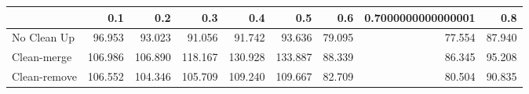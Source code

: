 \begin{tabular}{lrrrrrrrr}
\toprule
{} &     0.1 &     0.2 &     0.3 &     0.4 &     0.5 &    0.6 & 0.7000000000000001 &    0.8 \\
\midrule
No Clean Up  &  96.953 &  93.023 &  91.056 &  91.742 &  93.636 & 79.095 &             77.554 & 87.940 \\
Clean-merge  & 106.986 & 106.890 & 118.167 & 130.928 & 133.887 & 88.339 &             86.345 & 95.208 \\
Clean-remove & 106.552 & 104.346 & 105.709 & 109.240 & 109.667 & 82.709 &             80.504 & 90.835 \\
\bottomrule
\end{tabular}
